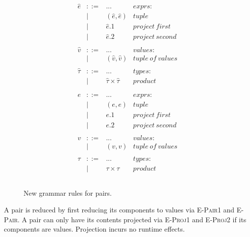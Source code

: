\begin{figure}[h]

\[
\begin{array}{c}

\begin{array}{lllr}

\hat e & ::= & ... & exprs: \\
	& | & (\hat e, \hat e) & tuple \\
	& | & \hat e.1 & project~first \\
	& | & \hat e.2 & project~second \\
	&&\\

\hat v & ::= & ... & values: \\
	& | & (\hat v, \hat v) & tuple~of~values \\
	&&\\
	
\hat \tau & ::= & ... & types: \\
	& | & \hat \tau \times \hat \tau & product \\
	&&\\

\end{array}

\begin{array}{lllr}

e & ::= & ... & exprs: \\
	& | & (e, e) & tuple \\
	& | & e.1 & project~first \\
	& | & e.2 & project~second \\
	&&\\

v & ::= & ... & values: \\
	& | & (v, v) & tuple~of~values \\
	&&\\
		
\tau & ::= & ... & types: \\
	& | & \tau \times \tau & product \\
	&&\\

\end{array}

\end{array}
\]

\vspace{-12pt}
\caption{New grammar rules for pairs.}
\label{A sample. }
\end{figure}

A pair is reduced by first reducing its components to values via \textsc{E-Pair1} and \textsc{E-Pair}. A pair can only have its contents projected via \textsc{E-Proj1} and \textsc{E-Proj2} if its components are values. Projection incurs no runtime effects.

